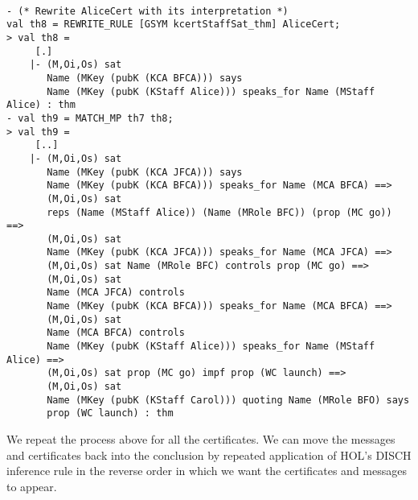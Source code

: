 \documentclass[10pt,twoside]{article}
\begin{document}
\begin{session}
  \begin{scriptsize}
\begin{verbatim}

- (* Rewrite AliceCert with its interpretation *)
val th8 = REWRITE_RULE [GSYM kcertStaffSat_thm] AliceCert;
> val th8 =
     [.]
    |- (M,Oi,Os) sat
       Name (MKey (pubK (KCA BFCA))) says
       Name (MKey (pubK (KStaff Alice))) speaks_for Name (MStaff Alice) : thm
- val th9 = MATCH_MP th7 th8;
> val th9 =
     [..]
    |- (M,Oi,Os) sat
       Name (MKey (pubK (KCA JFCA))) says
       Name (MKey (pubK (KCA BFCA))) speaks_for Name (MCA BFCA) ==>
       (M,Oi,Os) sat
       reps (Name (MStaff Alice)) (Name (MRole BFC)) (prop (MC go)) ==>
       (M,Oi,Os) sat
       Name (MKey (pubK (KCA JFCA))) speaks_for Name (MCA JFCA) ==>
       (M,Oi,Os) sat Name (MRole BFC) controls prop (MC go) ==>
       (M,Oi,Os) sat
       Name (MCA JFCA) controls
       Name (MKey (pubK (KCA BFCA))) speaks_for Name (MCA BFCA) ==>
       (M,Oi,Os) sat
       Name (MCA BFCA) controls
       Name (MKey (pubK (KStaff Alice))) speaks_for Name (MStaff Alice) ==>
       (M,Oi,Os) sat prop (MC go) impf prop (WC launch) ==>
       (M,Oi,Os) sat
       Name (MKey (pubK (KStaff Carol))) quoting Name (MRole BFO) says
       prop (WC launch) : thm
\end{verbatim}
  \end{scriptsize}
\end{session}
We repeat the process above for all the certificates. We can move the
messages and certificates back into the conclusion by repeated
application of HOL's DISCH inference rule in the reverse order in
which we want the certificates and messages to appear. 
\end{document}
